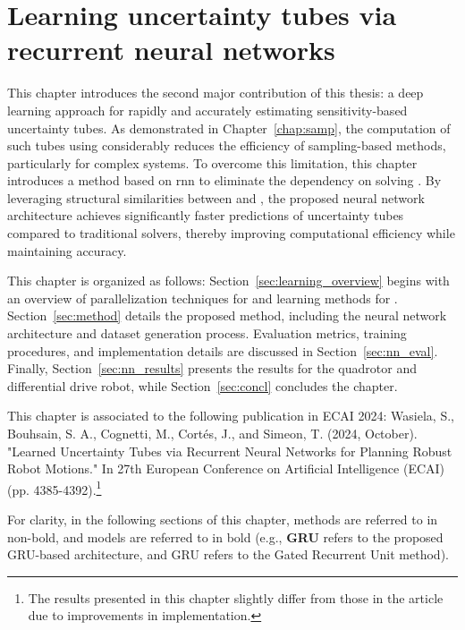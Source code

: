 \chapter{Learning uncertainty tubes via recurrent neural networks} \label{chap:NN}

This chapter introduces the second major contribution of this thesis: a deep learning approach for rapidly and accurately estimating sensitivity-based uncertainty tubes. 
As demonstrated in Chapter~\ref{chap:samp}, the computation of such tubes using  considerably reduces the efficiency of sampling-based methods, particularly for complex systems.
To overcome this limitation, this chapter introduces a method based on \gls{rnn} to eliminate the dependency on solving .
By leveraging structural similarities between  and , the proposed neural network architecture achieves significantly faster predictions of uncertainty tubes compared to traditional solvers, thereby improving computational efficiency while maintaining accuracy.

This chapter is organized as follows: Section~\ref{sec:learning_overview} begins with an overview of parallelization techniques for  and learning methods for .
Section~\ref{sec:method} details the proposed method, including the neural network architecture and dataset generation process. 
Evaluation metrics, training procedures, and implementation details are discussed in Section~\ref{sec:nn_eval}. 
Finally, Section~\ref{sec:nn_results} presents the results for the quadrotor and differential drive robot, while Section~\ref{sec:concl} concludes the chapter.

This chapter is associated to the following publication in ECAI 2024: Wasiela, S., Bouhsain, S. A., Cognetti, M., Cortés, J., and Simeon, T. (2024, October). "Learned Uncertainty Tubes via Recurrent Neural Networks for Planning Robust Robot Motions." In 27th European Conference on Artificial Intelligence (ECAI) (pp. 4385-4392).\footnote{The results presented in this chapter slightly differ from those in the article due to improvements in implementation.}

For clarity, in the following sections of this chapter, methods are referred to in non-bold, and models are referred to in bold (e.g., \textbf{GRU} refers to the proposed GRU-based architecture, and GRU refers to the Gated Recurrent Unit method).

